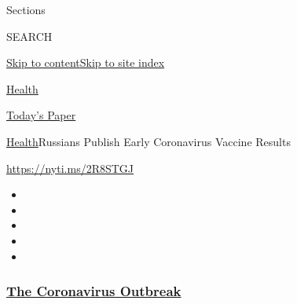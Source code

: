 Sections

SEARCH

\protect\hyperlink{site-content}{Skip to
content}\protect\hyperlink{site-index}{Skip to site index}

\href{https://www.nytimes3xbfgragh.onion/section/health}{Health}

\href{https://myaccount.nytimes3xbfgragh.onion/auth/login?response_type=cookie\&client_id=vi}{}

\href{https://www.nytimes3xbfgragh.onion/section/todayspaper}{Today's
Paper}

\href{/section/health}{Health}\textbar{}Russians Publish Early
Coronavirus Vaccine Results

\url{https://nyti.ms/2R8STGJ}

\begin{itemize}
\item
\item
\item
\item
\item
\end{itemize}

\hypertarget{the-coronavirus-outbreak}{%
\subsubsection{\texorpdfstring{\href{https://www.nytimes3xbfgragh.onion/news-event/coronavirus?name=styln-coronavirus-national\&region=TOP_BANNER\&block=storyline_menu_recirc\&action=click\&pgtype=Article\&impression_id=cd4570f0-f27f-11ea-b780-1bb5a09dbead\&variant=undefined}{The
Coronavirus
Outbreak}}{The Coronavirus Outbreak}}\label{the-coronavirus-outbreak}}

